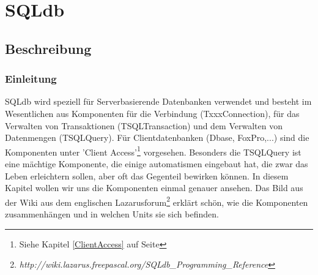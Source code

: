 \section[SQLdb - Serverdatenbank Komponenten]{SQLdb}
\subsection{Beschreibung}
\subsubsection{Einleitung}
SQLdb\label{SQLdb} wird speziell für Serverbasierende Datenbanken verwendet und besteht im Wesentlichen aus Komponenten für die Verbindung (TxxxConnection), für das Verwalten von Transaktionen (TSQLTransaction) und dem Verwalten von Datenmengen (TSQLQuery). Für Clientdatenbanken (Dbase, FoxPro,...) sind die Komponenten unter 'Client Access'\footnote{Siehe Kapitel \ref{ClientAccess} auf Seite \pageref{ClientAccess}} vorgesehen. 
\label{fig:LazSqlDB01}
Besonders die TSQLQuery ist eine mächtige Komponente, die einige automatismen eingebaut hat, die zwar das Leben erleichtern sollen, aber oft das Gegenteil bewirken können. In diesem Kapitel wollen wir uns die Komponenten einmal genauer ansehen. Das Bild aus der Wiki aus dem englischen Lazarusforum\cite{laz.en}\footnote{\textsl{http://wiki.lazarus.freepascal.org/SQLdb\_Programming\_Reference}} erklärt schön, wie die Komponenten zusammenhängen und in welchen Units sie sich befinden.


